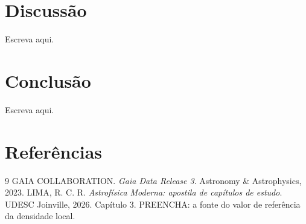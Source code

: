 \documentclass[10pt,a4paper,twocolumn]{article}
\begin{document}
\section{Discussão}
\label{sec:disc}
%
%
%

Escreva aqui.

\section{Conclusão}

Escreva aqui.

\section*{Referências}

\begin{thebibliography}{9}\footnotesize
{} GAIA COLLABORATION. \emph{Gaia Data Release 3}. Astronomy \&
Astrophysics, 2023.
 LIMA, R. C. R. \emph{Astrofísica Moderna: apostila de
capítulos de estudo}. UDESC Joinville, 2026. Capítulo 3.
 PREENCHA: a fonte do valor de referência da densidade local.
\end{thebibliography}
\end{document}

